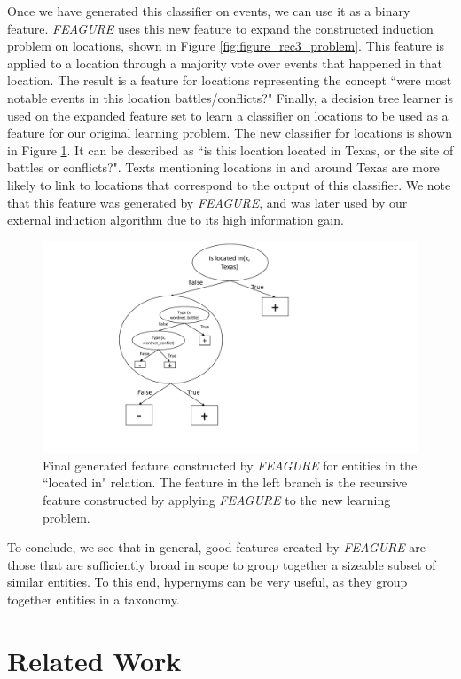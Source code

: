\documentclass[twoside,11pt]{article}
\theoremstyle{definition}
\begin{document}
Once we have generated this classifier on events, we can use it as a binary feature. \emph{FEAGURE} uses this new feature to expand the constructed induction problem on locations, shown in Figure \ref{fig:figure_rec3_problem}.
This feature is applied to a location through a majority vote over events that happened in that location. The result is a feature for locations representing the concept ``were most notable events in this location battles/conflicts?"
Finally, a decision tree learner is used on the expanded feature set to learn a classifier on locations to be used as a feature for our original learning problem. The new classifier for locations is shown in Figure \ref{fig:figure_rec3_feature_full}. It can be described as ``is this location located in Texas, or the site of battles or conflicts?".
Texts mentioning locations in and around Texas are more likely to link to locations that correspond to the output of this classifier.
We note that this feature was generated by \emph{FEAGURE}, and was later used by our external induction algorithm due to its high information gain. 

\begin{figure}[!h]
	\centering
	\includegraphics[width=0.6\linewidth]{figure_rec3_feature_new}
	\caption{Final generated feature constructed by \emph{FEAGURE} for entities in the ``located in" relation. The feature in the left branch is the recursive feature constructed by applying \emph{FEAGURE} to the new learning problem.}
	\label{fig:figure_rec3_feature_full}
\end{figure}

To conclude, we see that in general, good features created by \emph{FEAGURE} are those that are sufficiently broad in scope to group together a sizeable subset of similar entities. To this end, hypernyms can be very useful, as they group together entities in a taxonomy. 

\section{Related Work}
\end{document}
